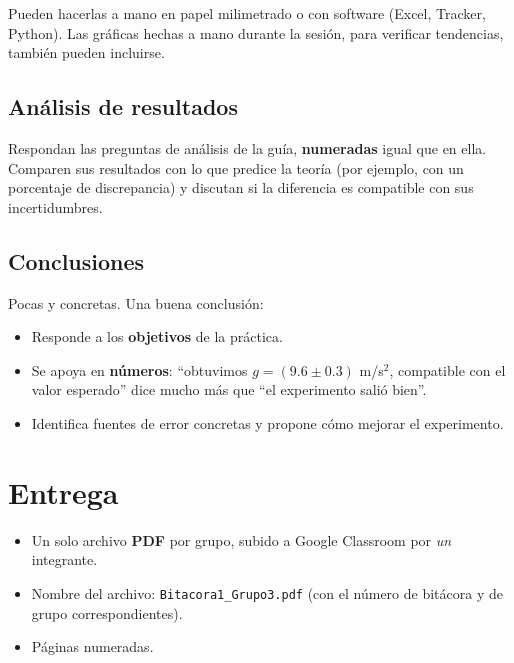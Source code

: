 \documentclass[11pt, letterpaper]{article}
\begin{document}
	\noindent
	Pueden hacerlas a mano en papel milimetrado o con software (Excel, Tracker,
	Python). Las gráficas hechas a mano durante la sesión, para verificar
	tendencias, también pueden incluirse.
	
	\subsection{Análisis de resultados}
	
	Respondan las preguntas de análisis de la guía, \textbf{numeradas} igual que en
	ella. Comparen sus resultados con lo que predice la teoría (por ejemplo, con un
	porcentaje de discrepancia) y discutan si la diferencia es compatible con sus
	incertidumbres.
	
	\subsection{Conclusiones}
	
	Pocas y concretas. Una buena conclusión:
	
	\begin{itemize}
		\item Responde a los \textbf{objetivos} de la práctica.
		\item Se apoya en \textbf{números}: ``obtuvimos $g = (9.6 \pm 0.3)$ m/s$^2$,
		compatible con el valor esperado'' dice mucho más que ``el experimento
		salió bien''.
		\item Identifica fuentes de error concretas y propone cómo mejorar el
		experimento.
	\end{itemize}
	

	\section{Entrega}
	
	\begin{itemize}
		\item Un solo archivo \textbf{PDF} por grupo, subido a Google Classroom por
		\emph{un} integrante.
		\item Nombre del archivo: \texttt{Bitacora1\_Grupo3.pdf} (con el número de
		bitácora y de grupo correspondientes).
		\item Páginas numeradas.
	\end{itemize}
	
\end{document}
